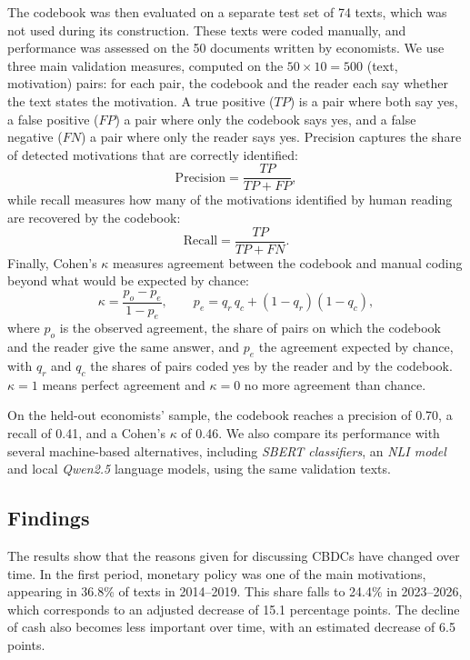 \documentclass[11pt,a4paper]{article}
\begin{document}
The codebook was then evaluated on a separate test set of 74 texts, which was not used during its construction. These texts were coded 
manually, and performance was assessed on the 50 documents written by economists. We use three main validation measures, computed on the $50 \times 10 = 500$ (text, motivation) pairs: for each pair, 
the codebook and the reader each say whether the text states the motivation. A true positive ($TP$) is a pair where both 
say yes, a false positive ($FP$) a pair where only the codebook says yes, and a false negative ($FN$) a pair where only 
the reader says yes. Precision captures the share of detected motivations that are correctly identified:
\begin{equation}\label{eq:precision}
\text{Precision} = \frac{TP}{TP + FP},
\end{equation}
while recall measures how many of the motivations identified by human reading are recovered by the codebook:
\begin{equation}\label{eq:recall}
\text{Recall} = \frac{TP}{TP + FN}.
\end{equation}
Finally, Cohen’s \(\kappa\) measures agreement between the codebook and manual coding beyond what would be expected by chance:
\begin{equation}\label{eq:kappa}
\kappa = \frac{p_o - p_e}{1 - p_e},
\qquad
p_e = q_r\, q_c + (1 - q_r)(1 - q_c),
\end{equation}
where \(p_o\) is the observed agreement, the share of pairs on which the codebook and the reader give the same answer, and 
\(p_e\) the agreement expected by chance, with \(q_r\) and \(q_c\) the shares of pairs coded yes by the reader and by the codebook. 
$\kappa = 1$ means perfect agreement and $\kappa = 0$ no more agreement than chance.

On the held-out economists’ sample, the codebook reaches a precision of 0.70, a recall of 0.41, and a Cohen’s \(\kappa\) of 0.46. 
We also compare its performance with several machine-based alternatives, including \textit{SBERT classifiers}, an \textit{NLI model} 
and local \textit{Qwen2.5} language models, using the same validation texts.

\subsection{Findings}
The results show that the reasons given for discussing CBDCs have changed over time. In the first period, monetary policy was one 
of the main motivations, appearing in 36.8\% of texts in 2014–2019. This share falls to 24.4\% in 2023–2026, which corresponds 
to an adjusted decrease of 15.1 percentage points. The decline of cash also becomes less important over time, with an estimated decrease of 6.5 points.
\end{document}
